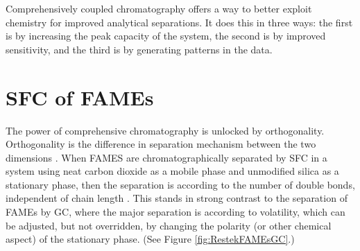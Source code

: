 Comprehensively coupled chromatography offers a way to better exploit chemistry
for improved analytical separations. It does this in three ways: the first is by
increasing the peak capacity of the system, the second is by improved
sensitivity, and the third is by generating patterns in the data.

\section{SFC of FAMEs}

The power of comprehensive chromatography is unlocked by orthogonality.
Orthogonality is the difference in separation mechanism between the two
dimensions \autocite{Marriott2012}. When FAMES are chromatographically separated
by SFC in a system using neat carbon dioxide as a mobile phase and unmodified silica as
a stationary phase, then the separation is according to the number of double
bonds, independent of chain length \autocite{Robertson1991, Smith1994,
Smith2001}. This stands in strong contrast to the separation of FAMEs by GC,
where the major separation is according to volatility, which can be adjusted,
but not overridden, by changing the polarity (or other chemical aspect) of the
stationary phase. (See Figure \ref{fig:RestekFAMEsGC}.)

